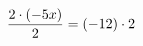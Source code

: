 \documentclass[preview]{standalone}
\begin{document}
\begin{align*}
\special{dvisvgm:raw <g id='unique000'>}\frac{2 \cdot (-5 x)}{2} = (-12) \cdot 2\special{dvisvgm:raw </g>}
\end{align*}
\end{document}
